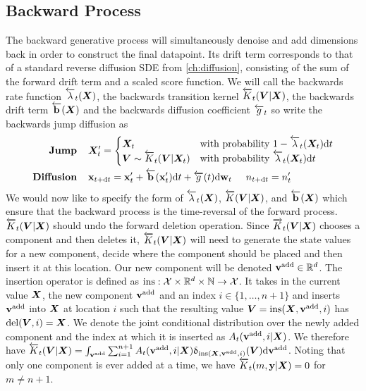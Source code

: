 \subsection{Backward Process}
The backward generative process will simultaneously denoise and add dimensions back in order to construct the final datapoint. Its drift term corresponds to that of a standard reverse diffusion SDE from \cref{ch:diffusion}, consisting of the sum of the forward drift term and a scaled score function. We will call the backwards rate function $\overleftarrow{\lambda}_t({\bm{X}})$, the backwards transition kernel $\overleftarrow{K}_t({\bm{V}} | {\bm{X}})$, the backwards drift term $\overleftarrow{\mathbf{b}}({\bm{X}})$ and the backwards diffusion coefficient $\overleftarrow{g}_{t}$ so write the backwards jump diffusion as
\begin{align}
    \label{eq:tddm-reverse-jump}
    \textbf{Jump} \hspace{.4cm} & {\bm{X}}_t' = \begin{cases}
        {\bm{X}}_t & \text{with probability } 1 - \overleftarrow{\lambda}_t({\bm{X}}_t) \mathrm{d} t \\
        {\bm{V}} \sim \overleftarrow{K}_t( {\bm{V}} |{\bm{X}}_t) & \text{with probability } \overleftarrow{\lambda}_t({\bm{X}}_t) \mathrm{d} t
    \end{cases} 
    \\
    \label{eq:tddm-reverse-diffusion}
    \textbf{Diffusion} \hspace{.4cm} &{\mathbf{x}}_{t+ \mathrm{d} t} = {\mathbf{x}}'_t + \overleftarrow{\mathbf{b}}({\mathbf{x}}'_t)
    \mathrm{d} t + \overleftarrow{g}(t) \mathrm{d} \mathbf{w}_t \hspace{.5cm} n_{t+\mathrm{d} t} = n_t'
\end{align}
We would now like to specify the form of $\overleftarrow{\lambda}_t({\bm{X}})$, $\overleftarrow{K}({\bm{V}}|{\bm{X}})$, and $\overleftarrow{\mathbf{b}}({\bm{X}})$ which ensure that the backward process is the time-reversal of the forward process. 
$\overleftarrow{K}_t({\bm{V}} | {\bm{X}})$ should undo the forward deletion operation. Since $\overrightarrow{K}_t({\bm{V}} | {\bm{X}})$ chooses a component and then deletes it, $\overleftarrow{K}_t({\bm{V}} | {\bm{X}})$ will need to generate the state values for a new component, decide where the component should be placed and then insert it at this location. 
Our new component will be denoted ${\mathbf{v}}^{\textup{add}} \in \mathbb{R}^{d}$. 
The insertion operator is defined as $\text{ins}: {\mathcal{X}} \times \mathbb{R}^{d} \times \mathbb{N} \rightarrow {\mathcal{X}}$. It takes in the current value ${\bm{X}}$, the new component ${\mathbf{v}}^{\textup{add}}$ and an index $i \in \{1, \dots, n+1\}$ and inserts ${\mathbf{v}}^{\textup{add}}$ into ${\bm{X}}$ at location $i$ such that the resulting value ${\bm{V}} = \text{ins}({\bm{X}}, {\mathbf{v}}^{\textup{add}}, i)$ has $\text{del}({\bm{V}}, i) = {\bm{X}}$.
We denote the joint conditional distribution over the newly added component and the index at which it is inserted as $A_t({\mathbf{v}}^{\textup{add}}, i | {\bm{X}})$.
We therefore have $\overleftarrow{K}_t({\bm{V}} | {\bm{X}}) = \int_{{\mathbf{v}}^{\textup{add}}} \sum_{i=1}^{n+1}  A_t({\mathbf{v}}^{\textup{add}}, i | {\bm{X}}) \updelta_{\text{ins}({\bm{X}}, {\mathbf{v}}^{\textup{add}}, i)}({\bm{V}}) \mathrm{d} {\mathbf{v}}^{\textup{add}}$. Noting that only one component is ever added at a time, we have $\overleftarrow{K}_t(m, {\mathbf{y}} | {\bm{X}}) = 0$ for $m \neq n+1$. 

